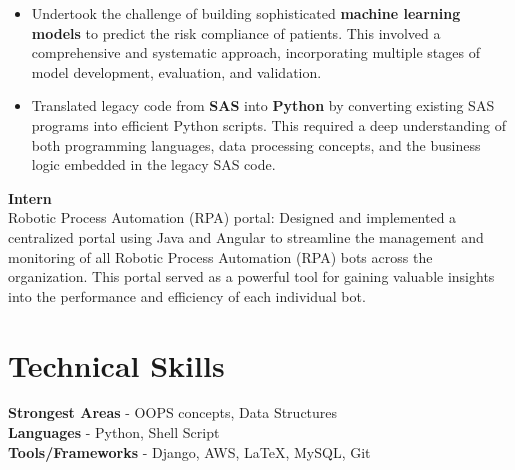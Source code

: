 \documentclass[margin, centered]{res}
\begin{document}
\begin{resume}
\begin{itemize}
    \item Undertook the challenge of building sophisticated \textbf{machine learning models} to predict the risk compliance of patients. This involved a comprehensive and systematic approach, incorporating multiple stages of model development, evaluation, and validation.

    \item Translated legacy code from \textbf{SAS} into \textbf{Python} by converting existing SAS programs into efficient Python scripts. This required a deep understanding of both programming languages, data processing concepts, and the business logic embedded in the legacy SAS code.
\end{itemize}

\textbf{Intern \href{http://www..com/}{}} \\
Robotic Process Automation (RPA) portal: Designed and implemented a centralized portal using Java and Angular to streamline the management and monitoring of all Robotic Process Automation (RPA) bots across the organization. This portal served as a powerful tool for gaining valuable insights into the performance and efficiency of each individual bot.


\section{Technical \hspace{2mm} Skills}
\textbf{Strongest Areas} - OOPS concepts, Data Structures \\
\textbf{Languages} - Python, Shell Script \\
\textbf{Tools/Frameworks} - Django, AWS, \LaTeX, MySQL, Git





\end{resume}
\end{document}
